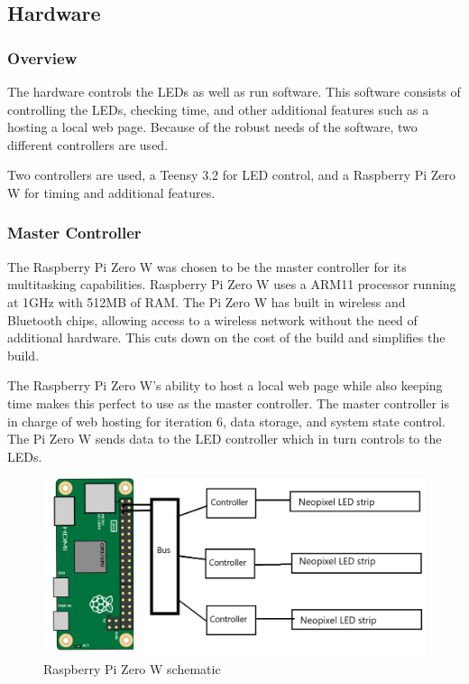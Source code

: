 		\subsection{Hardware}
			\subsubsection{Overview}
			\noindent The hardware controls the LEDs as well as run software. This software
			consists of controlling the LEDs, checking time, and other additional
			features such as a hosting a local web page. Because of the robust needs of
			the software, two different controllers are used.

			\noindent Two controllers are used, a Teensy 3.2 for LED control, and a Raspberry Pi Zero W for timing
			and additional features.
			\subsubsection{Master Controller}
			\noindent The Raspberry Pi Zero W was chosen to be the master controller for its
			multitasking capabilities. Raspberry Pi Zero W uses a ARM11 processor
			running at 1GHz with 512MB of RAM. \cite{pizero} The Pi Zero W has built in wireless and
			Bluetooth chips, allowing access to a wireless network without the need
			of additional hardware. This cuts down on the cost of the build and
			simplifies the build.

			\noindent The Raspberry Pi Zero W's ability to host a local web page while also
			keeping time makes this perfect to use as the master controller. The
			master controller is in charge of web hosting for iteration 6,
			data storage, and system state control. The Pi Zero W sends data to the LED controller which in turn controls
			to the LEDs.
			\begin{center}
				\begin{figure}[H]
					\includegraphics[width=\linewidth]{systemDiagrams/pischem.png}
					\caption{Raspberry Pi Zero W schematic}
					\label{fig:piSchematic}
				\end{figure}
			\end{center}
